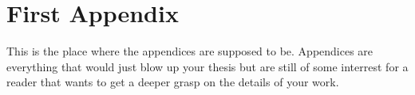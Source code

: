 \documentclass[12pt, a4paper, fleqn]{memoir}%
\begin{document}
\chapter{First Appendix}
\label{app:FirstAppendix}
This is the place where the appendices are supposed to be. Appendices are everything that would just blow up your thesis but are still of some interrest for a reader that wants to get a deeper grasp on the details of your work.

\backmatter

\end{document}
